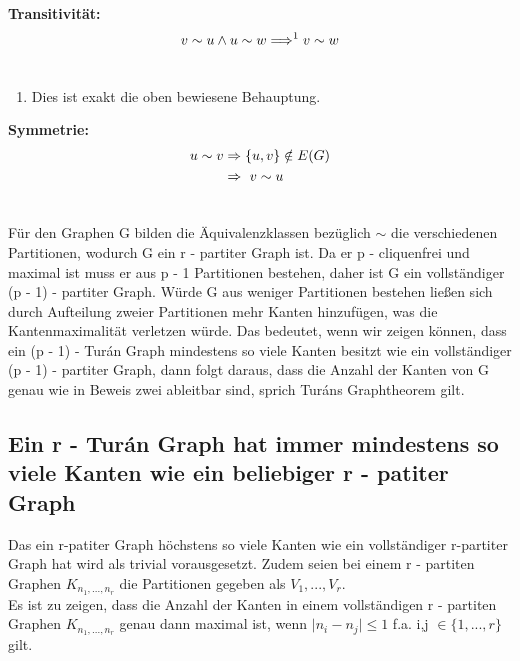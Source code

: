 \documentclass[12pt, a4paper]{article}
\begin{document}
\textbf{Transitivität:}
\begin{gather}
\begin{split} v \sim u \wedge u \sim w \Longrightarrow^1 v \sim w\end{split}\notag\\\begin{split}\end{split}\notag
\end{gather}\begin{enumerate}
\item {}
Dies ist exakt die oben bewiesene Behauptung.

\end{enumerate}

\textbf{Symmetrie:}
\begin{gather}
\begin{split}u \sim v &\Rightarrow \{ u,v \} \notin E(G) \\
&\Rightarrow\ v \sim u\end{split}\notag\\\begin{split}\end{split}\notag
\end{gather}

Für den Graphen G bilden die Äquivalenzklassen bezüglich $\sim$ die verschiedenen Partitionen, wodurch G ein r - partiter Graph ist. Da er p - cliquenfrei und maximal ist muss er aus p - 1 Partitionen bestehen, daher ist G ein vollständiger (p - 1) - partiter Graph. Würde G aus weniger Partitionen bestehen ließen sich durch Aufteilung zweier Partitionen mehr Kanten hinzufügen, was die Kantenmaximalität verletzen würde. Das bedeutet, wenn wir zeigen können, dass ein (p - 1) - Turán Graph mindestens so viele Kanten besitzt wie ein vollständiger (p - 1) - partiter Graph, dann folgt daraus, dass die Anzahl der Kanten von G genau wie in Beweis zwei ableitbar sind, sprich Turáns Graphtheorem gilt.

\subsection{Ein r - Turán Graph hat immer mindestens so viele Kanten wie ein beliebiger  r - patiter Graph}
Das ein r-patiter Graph höchstens so viele Kanten wie ein vollständiger r-partiter Graph hat wird als trivial vorausgesetzt. Zudem seien bei einem r - partiten Graphen $K_{n_1,...,n_r}$  die Partitionen gegeben als $V_1, ..., V_r$. \\
Es ist zu zeigen, dass die Anzahl der Kanten in einem vollständigen r - partiten Graphen $K_{n_1,...,n_r}$ genau dann maximal ist, wenn $\mid n_i - n_j \mid \le 1$ f.a. i,j $\in \{1, ...,  r \}$ gilt.
\end{document}
